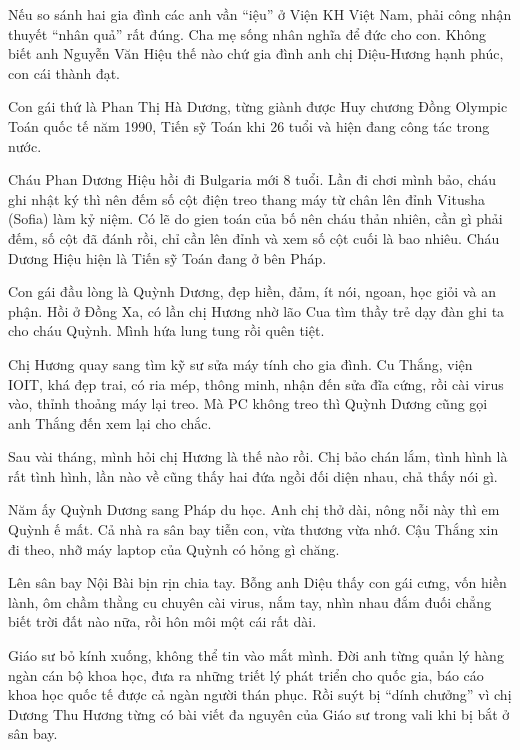 Nếu so sánh hai gia đình các anh vần “iệu” ở Viện KH Việt Nam, phải công nhận thuyết “nhân quả” rất đúng. Cha mẹ sống nhân nghĩa để đức cho con. Không biết anh Nguyễn Văn Hiệu thế nào chứ gia đình anh chị Diệu-Hương hạnh phúc, con cái thành đạt.

Con gái thứ là Phan Thị Hà Dương, từng giành được Huy chương Đồng Olympic Toán quốc tế năm 1990, Tiến sỹ Toán khi 26 tuổi và hiện đang công tác trong nước.




Cháu Phan Dương Hiệu hồi đi Bulgaria mới 8 tuổi. Lần đi chơi mình bảo, cháu ghi nhật ký thì nên đếm số cột điện treo thang máy từ chân lên đỉnh Vitusha (Sofia) làm kỷ niệm. Có lẽ do gien toán của bố nên cháu thản nhiên, cần gì phải đếm, số cột đã đánh rồi, chỉ cần lên đỉnh và xem số cột cuối là bao nhiêu. Cháu Dương Hiệu hiện là Tiến sỹ Toán đang ở bên Pháp.

Con gái đầu lòng là Quỳnh Dương, đẹp hiền, đảm, ít nói, ngoan, học giỏi và an phận. Hồi ở Đồng Xa, có lần chị Hương nhờ lão Cua tìm thầy trẻ dạy đàn ghi ta cho cháu Quỳnh. Mình hứa lung tung rồi quên tiệt.

Chị Hương quay sang tìm kỹ sư sửa máy tính cho gia đình. Cu Thắng, viện IOIT, khá đẹp trai, có ria mép, thông minh, nhận đến sửa đĩa cứng, rồi cài virus vào, thỉnh thoảng máy lại treo. Mà PC không treo thì Quỳnh Dương cũng gọi anh Thắng đến xem lại cho chắc.

Sau vài tháng, mình hỏi chị Hương là thế nào rồi. Chị bảo chán lắm, tình hình là rất tình hình, lần nào về cũng thấy hai đứa ngồi đối diện nhau, chả thấy nói gì.

Năm ấy Quỳnh Dương sang Pháp du học. Anh chị thở dài, nông nỗi này thì em Quỳnh ế mất. Cả nhà ra sân bay tiễn con, vừa thương vừa nhớ. Cậu Thắng xin đi theo, nhỡ máy laptop của Quỳnh có hỏng gì chăng.

Lên sân bay Nội Bài bịn rịn chia tay. Bỗng anh Diệu thấy con gái cưng, vốn hiền lành, ôm chầm thằng cu chuyên cài virus, nắm tay, nhìn nhau đắm đuối chẳng biết trời đất nào nữa, rồi hôn môi một cái rất dài.

Giáo sư bỏ kính xuống, không thể tin vào mắt mình. Đời anh từng quản lý hàng ngàn cán bộ khoa học, đưa ra những triết lý phát triển cho quốc gia, báo cáo khoa học quốc tế được cả ngàn người thán phục. Rồi suýt bị “dính chưởng” vì chị Dương Thu Hương từng có bài viết đa nguyên của Giáo sư trong vali khi bị bắt ở sân bay. 

